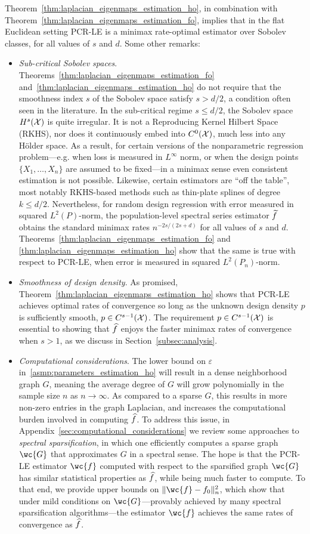 Theorem~\ref{thm:laplacian_eigenmaps_estimation_ho}, in combination with Theorem~\ref{thm:laplacian_eigenmaps_estimation_fo}, implies that in the flat Euclidean setting PCR-LE is a minimax rate-optimal estimator over Sobolev classes, for all values of $s$ and $d$. Some other remarks:
\begin{itemize}
	\item \emph{Sub-critical Sobolev spaces}. Theorems~\ref{thm:laplacian_eigenmaps_estimation_fo} and~\ref{thm:laplacian_eigenmaps_estimation_ho} do not require that the smoothness index $s$ of the Sobolev space satisfy $s > d/2$, a condition often seen in the literature. In the sub-critical regime $s \leq d/2$, the Sobolev space $H^s(\mathcal{X})$ is quite irregular. It is not a Reproducing Kernel Hilbert Space (RKHS), nor does it continuously embed into $C^0(\mathcal{X})$, much less into any H\"{o}lder space. As a result, for certain versions of the nonparametric regression problem---e.g. when loss is measured in $L^{\infty}$ norm, or when the design points $\{X_1,\ldots,X_n\}$ are assumed to be fixed---in a minimax sense even consistent estimation is not possible. Likewise, certain estimators are ``off the table'', most notably RKHS-based methods such as thin-plate splines of degree $k \leq d/2$. Nevertheless, for random design regression with error measured in squared $L^2(P)$-norm, the population-level spectral series estimator $\widetilde{f}$ obtains the standard minimax rates $n^{-2s/(2s + d)}$ for all values of $s$ and $d$. Theorems~\ref{thm:laplacian_eigenmaps_estimation_fo} and \ref{thm:laplacian_eigenmaps_estimation_ho} show that the same is true with respect to PCR-LE, when error is measured in squared $L^2(P_n)$-norm.
	\item \emph{Smoothness of design density}. As promised,  Theorem~\ref{thm:laplacian_eigenmaps_estimation_ho} shows that PCR-LE achieves optimal rates of convergence so long as the unknown design density $p$ is sufficiently smooth, $p \in C^{s - 1}(\mathcal{X})$. The requirement $p \in C^{s - 1}(\mathcal{X})$ is essential to showing that $\widehat{f}$ enjoys the faster minimax rates of convergence when $s > 1$,  as we discuss in Section~\ref{subsec:analysis}. 
	\item \emph{Computational considerations}. The lower bound on $\varepsilon$ in~\ref{asmp:parameters_estimation_ho} will result in a dense neighborhood graph $G$, meaning the average degree of $G$ will grow polynomially in the sample size $n$ as $n \to \infty$. As compared to a sparse $G$, this results in more non-zero entries in the graph Laplacian, and increases the computational burden involved in computing $\widehat{f}$. To address this issue, in Appendix~\ref{sec:computational_considerations} we review some approaches to \emph{spectral sparsification}, in which one efficiently computes a sparse graph $\wc{G}$ that approximates $G$ in a spectral sense. The hope is that the PCR-LE estimator $\wc{f}$ computed with respect to the sparsified graph $\wc{G}$ has similar statistical properties as $\widehat{f}$, while being much faster to compute. To that end, we provide upper bounds on $\|\wc{f} - f_0\|_n^2$, which show that under mild conditions on $\wc{G}$---provably achieved by many spectral sparsification algorithms---the estimator $\wc{f}$ achieves the same rates of convergence as $\widehat{f}$. 

\end{itemize}
